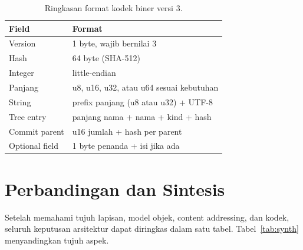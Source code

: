 \documentclass[11pt,a4paper]{article}
\begin{document}
\begin{table}[H]
	\centering
	\caption{Ringkasan format kodek biner versi 3.}
	\label{tab:codec}
	\footnotesize
	\begin{tabularx}{\textwidth}{l X}
		\toprule
		Field          & Format                                  \\
		\midrule
		Version        & 1 byte, wajib bernilai 3                \\
		Hash           & 64 byte (SHA-512)                       \\
		Integer        & little-endian                           \\
		Panjang        & u8, u16, u32, atau u64 sesuai kebutuhan \\
		String         & prefix panjang (u8 atau u32) + UTF-8    \\
		Tree entry     & panjang nama + nama + kind + hash       \\
		Commit parent  & u16 jumlah + hash per parent            \\
		Optional field & 1 byte penanda + isi jika ada           \\
		\bottomrule
	\end{tabularx}
\end{table}

\section{Perbandingan dan Sintesis}

Setelah memahami tujuh lapisan, model objek, content addressing, dan kodek, seluruh keputusan arsitektur dapat diringkas dalam satu tabel. Tabel~\ref{tab:synth} menyandingkan tujuh aspek.
\end{document}
